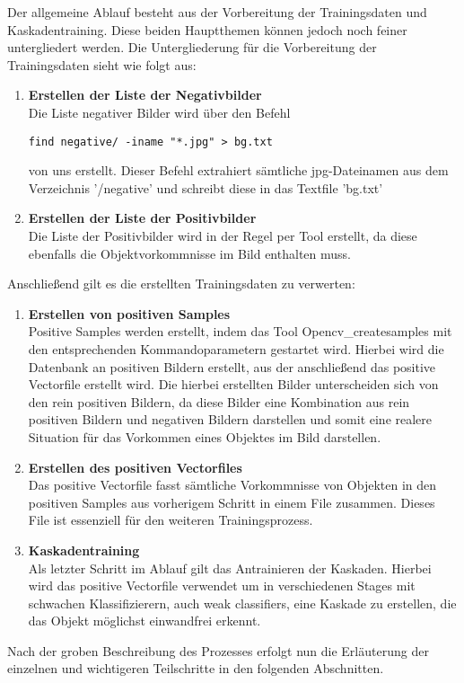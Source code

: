 Der allgemeine Ablauf besteht aus der Vorbereitung der Trainingsdaten und Kaskadentraining. Diese beiden Hauptthemen können jedoch noch feiner untergliedert werden. Die Untergliederung für die Vorbereitung der Trainingsdaten sieht wie folgt aus:
\begin{enumerate}
\item \textbf{Erstellen der Liste der Negativbilder}\\ Die Liste negativer Bilder wird über den Befehl
\begin{lstlisting}
find negative/ -iname "*.jpg" > bg.txt
\end{lstlisting}
von uns erstellt. Dieser Befehl extrahiert sämtliche jpg-Dateinamen aus dem Verzeichnis '/negative' und schreibt diese in das Textfile 'bg.txt'
\item \textbf{Erstellen der Liste der Positivbilder}\\ Die Liste der Positivbilder wird in der Regel per Tool erstellt, da diese ebenfalls die Objektvorkommnisse im Bild enthalten muss.
\end{enumerate}
Anschließend gilt es die erstellten Trainingsdaten zu verwerten:
\begin{enumerate}
\item \textbf{Erstellen von positiven Samples}\\ Positive Samples werden erstellt, indem das Tool Opencv\_createsamples mit den entsprechenden Kommandoparametern gestartet wird. Hierbei wird die Datenbank an positiven Bildern erstellt, aus der anschließend das positive Vectorfile erstellt wird. Die hierbei erstellten Bilder unterscheiden sich von den rein positiven Bildern, da diese Bilder eine Kombination aus rein positiven Bildern und negativen Bildern darstellen und somit eine realere Situation für das Vorkommen eines Objektes im Bild darstellen.
\item \textbf{Erstellen des positiven Vectorfiles}\\ Das positive Vectorfile fasst sämtliche Vorkommnisse von Objekten in den positiven Samples aus vorherigem Schritt in einem File zusammen. Dieses File ist essenziell für den weiteren Trainingsprozess.
\item \textbf{Kaskadentraining}\\ Als letzter Schritt im Ablauf gilt das Antrainieren der Kaskaden. Hierbei wird das positive Vectorfile verwendet um in verschiedenen Stages mit schwachen Klassifizierern, auch weak classifiers, eine Kaskade zu erstellen, die das Objekt möglichst einwandfrei erkennt.
\end{enumerate}
Nach der groben Beschreibung des Prozesses erfolgt nun die Erläuterung der einzelnen und wichtigeren Teilschritte in den folgenden Abschnitten.